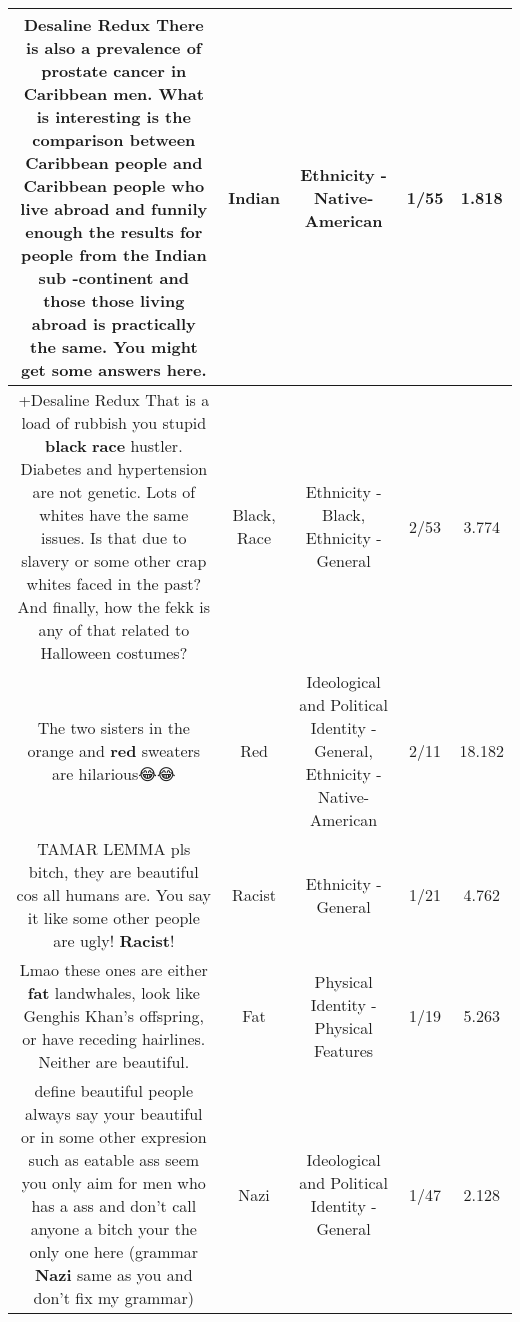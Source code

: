 \documentclass[11pt]{article}
\newlength\mylength
\begin{document}
\begin{center}
\begin{longtable}{|C{.65\mylength}|C{.30\mylength}|C{.12\mylength}|C{.12\mylength}|C{.12\mylength}|}
  \small Desaline Redux There is also a prevalence of prostate cancer in Caribbean men. What is interesting is the comparison between Caribbean people and Caribbean people who live abroad and funnily enough the results for people from the \textbf{Indian} sub -continent  and those those living abroad is practically the same. You might get some answers here.\normalsize   & Indian & Ethnicity - Native-American & 1/55 & 1.818 \\  \hline
  \small +Desaline Redux That is a load of rubbish you stupid \textbf{black} \textbf{race} hustler. Diabetes and hypertension are not genetic. Lots of whites have the same issues. Is that due to slavery or some other crap whites faced in the past? And finally, how the fekk is any of that related to Halloween costumes?\normalsize   & Black, Race & Ethnicity - Black, Ethnicity - General & 2/53 & 3.774 \\  \hline
  \small The two sisters in the orange and \textbf{r\textbf{ed}} sweaters are hilarious😂😂\normalsize   & Red &  Ideological and Political Identity - General, Ethnicity - Native-American & 2/11 & 18.182 \\  \hline
  \small TAMAR LEMMA pls bitch, they are beautiful cos all humans are. You say it like some other people are ugly! \textbf{Racist}!\normalsize   & Racist & Ethnicity - General & 1/21 & 4.762 \\  \hline
  \small Lmao these ones are either \textbf{fat} landwhales, look like Genghis Khan's offspring, or have receding hairlines. Neither are beautiful.\normalsize   & Fat & Physical Identity - Physical Features & 1/19 & 5.263 \\  \hline
  \small define beautiful people always say your beautiful or in some other expresion such as eatable ass seem you only aim for men who has a ass and don't call anyone a bitch your the only one here (grammar \textbf{Nazi} same as you and don't fix my grammar)\normalsize   & Nazi &  Ideological and Political Identity - General & 1/47 & 2.128 \\  \hline

\end{longtable}
\end{center}
\end{document}
